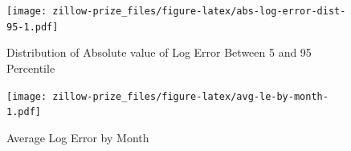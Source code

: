 \documentclass[]{book}
\newenvironment{Shaded}{\begin{snugshade}}{\end{snugshade}}
\newcommand{\KeywordTok}[1]{\textcolor[rgb]{0.13,0.29,0.53}{\textbf{#1}}}
\newcommand{\DataTypeTok}[1]{\textcolor[rgb]{0.13,0.29,0.53}{#1}}
\newcommand{\DecValTok}[1]{\textcolor[rgb]{0.00,0.00,0.81}{#1}}
\newcommand{\StringTok}[1]{\textcolor[rgb]{0.31,0.60,0.02}{#1}}
\newcommand{\OperatorTok}[1]{\textcolor[rgb]{0.81,0.36,0.00}{\textbf{#1}}}
\newcommand{\NormalTok}[1]{#1}
\theoremstyle{definition}
\theoremstyle{definition}
\theoremstyle{definition}
\theoremstyle{remark}
\begin{document}
\begin{figure}
\centering
\texttt{[image: zillow-prize\_files/figure-latex/abs-log-error-dist-95-1.pdf]}
\caption{\label{fig:abs-log-error-dist-95}Distribution of Absolute value of
Log Error Between 5 and 95 Percentile}
\end{figure}

\begin{Shaded}
\end{Shaded}

\begin{figure}
\centering
\texttt{[image: zillow-prize\_files/figure-latex/avg-le-by-month-1.pdf]}
\caption{\label{fig:avg-le-by-month}Average Log Error by Month}
\end{figure}
\end{document}
